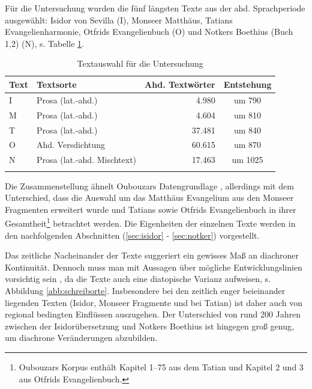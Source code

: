 Für die Untersuchung wurden die fünf längsten Texte aus der ahd. Sprachperiode ausgewählt: Isidor von Sevilla (I), Monseer Matthäus, Tatians Evangelienharmonie, Otfrids Evangelienbuch (O) und Notkers Boethius (Buch 1,2) (N), s. Tabelle  \ref{tab:ddd-auswahl}. 
 
\begin{table}
\centering

\begin{tabular}{llrc}
\lsptoprule
Text                  & Textsorte      & Ahd. Textwörter & Entstehung \\ \midrule
I                      & Prosa (lat.-ahd.)          &   4.980                  & um 790       \\
M         & Prosa (lat.-ahd.)          & 4.604            & um 810              \\
T & Prosa (lat.-ahd.)          & 37.481                  & um 840              \\
O     & Ahd. Versdichtung          & 60.615               & um 870              \\
N   & Prosa (lat.-ahd. Mischtext) &  17.463               & um 1025             \\ \lspbottomrule
\end{tabular}
\caption{Textauswahl für die Untersuchung}
\label{tab:ddd-auswahl}
\end{table}


\noindent 
Die Zusammenstellung ähnelt Oubouzars Datengrundlage \parencite[41f.]{Oubouzar1989}, allerdings mit dem Unterschied, dass die Auswahl um das Matthäus Evangelium aus den Monseer Fragmenten erweitert wurde und Tatians sowie Otfrids Evangelienbuch in ihrer Gesamtheit\footnote{Oubouzars Korpus enthält Kapitel 1--75 aus dem Tatian und Kapitel 2 und 3 aus Otfrids Evangelienbuch.} betrachtet werden.  Die Eigenheiten der einzelnen Texte werden in den nachfolgenden Abschnitten (\ref{sec:isidor} - \ref{sec:notker}) vorgestellt. 

Das zeitliche Nacheinander der Texte suggeriert ein gewisses Maß an diachroner Kontinuität. Dennoch muss man mit Aussagen über mögliche Entwicklungslinien  vorsichtig sein \parencite[vgl. hierzu auch][158]{Leiss2000}, da die Texte auch eine diatopische Varianz aufweisen, s. Abbildung \ref{abb:schreiborte}. Insbesondere bei den zeitlich enger beieinander liegenden Texten (Isidor, Monseer Fragmente und bei Tatian) ist daher auch von regional bedingten Einflüssen auszugehen. Der Unterschied von rund 200 Jahren zwischen der Isidorübersetzung und Notkers Boethius ist hingegen groß genug, um diachrone Veränderungen abzubilden.


